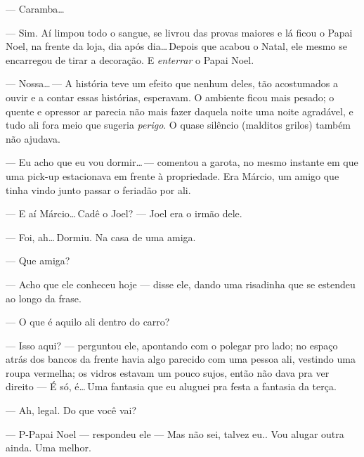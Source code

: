 --- Caramba\ldots

--- Sim. Aí limpou todo o sangue, se livrou das provas maiores e lá ficou o Papai Noel, na frente da loja, dia após dia\ldots\,Depois que acabou o Natal, ele mesmo se encarregou de tirar a decoração. E \emph{enterrar} o Papai Noel.

--- Nossa\ldots\,--- A história teve um efeito que nenhum deles, tão acostumados a ouvir e a contar essas histórias, esperavam. O ambiente ficou mais pesado; o quente e opressor ar parecia não mais fazer daquela noite uma noite agradável, e tudo ali fora meio que sugeria \emph{perigo}. O quase silêncio (malditos grilos) também não ajudava.

--- Eu acho que eu vou dormir\ldots\,--- comentou a garota, no mesmo instante em que uma pick-up estacionava em frente à propriedade. Era Márcio, um amigo que tinha vindo junto passar o feriadão por ali.

--- E aí Márcio\ldots\,Cadê o Joel? --- Joel era o irmão dele.

--- Foi, ah\ldots\,Dormiu. Na casa de uma amiga.

--- Que amiga?

--- Acho que ele conheceu hoje --- disse ele, dando uma risadinha que se estendeu ao longo da frase.

--- O que é aquilo ali dentro do carro?

--- Isso aqui? --- perguntou ele, apontando com o polegar pro lado; no espaço atrás dos bancos da frente havia algo parecido com uma pessoa ali, vestindo uma roupa vermelha; os vidros estavam um pouco sujos, então não dava pra ver direito --- É só, é\ldots\,Uma fantasia que eu aluguei pra festa a fantasia da terça.

--- Ah, legal. Do que você vai?

--- P-Papai Noel --- respondeu ele --- Mas não sei, talvez eu.. Vou alugar outra ainda. Uma melhor.
